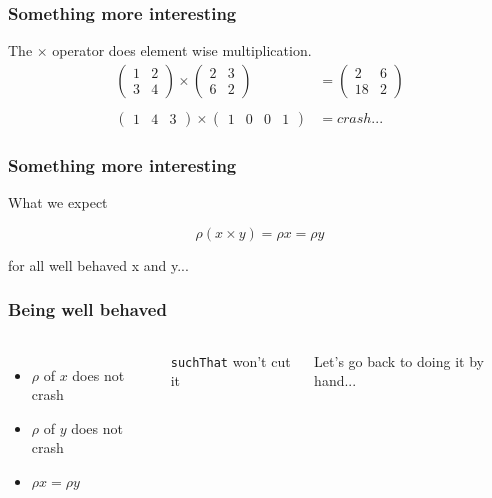 \documentclass{beamer}
\begin{document}
\begin{frame}
    \frametitle{Something more interesting}
        The $\times$ operator does element wise multiplication.\\
        \begin{align*}
            \begin{pmatrix} 1 & 2\\3 & 4\end{pmatrix} \times \begin{pmatrix} 2 & 3\\6 & 2\end{pmatrix} &=
            \begin{pmatrix} 2 & 6\\18 & 2\end{pmatrix}\\\\
            \begin{pmatrix} 1 & 4 & 3 \end{pmatrix} \times \begin{pmatrix}1 & 0 & 0 & 1 \end{pmatrix} &= crash...
        \end{align*}
\end{frame}

\begin{frame}
    \frametitle{Something more interesting}
        \centerline{What we expect}
        \begin{equation*}
            \rho (x \times y) = \rho x = \rho y
        \end{equation*}
        \centerline{}
        \centerline{for all well behaved x and y...}
\end{frame}

\begin{frame}
    \frametitle{Being well behaved}
        \begin{columns}
                \begin{itemize}
                    \item $\rho$ of $x$ does not crash
                    \item $\rho$ of $y$ does not crash
                    \item $\rho x = \rho y$
                \end{itemize}
                \pause
                \centerline{\texttt{suchThat} won't cut it}
                \centerline{}
                \centerline{Let's go back to doing it by hand...}
        \end{columns}
\end{frame}
\end{document}
